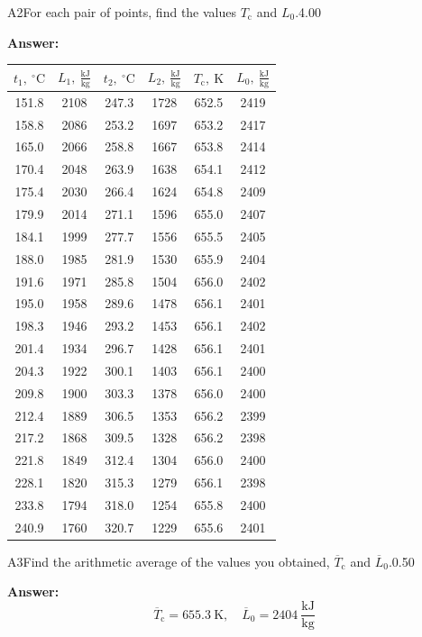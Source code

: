 \documentclass[11pt,a4paper]{article}
\begin{document}
\begin{solcard}{A2}{For each pair of points, find the values $T_\mathrm c$ and $L_0$.}{4.00}
\par\smallskip\noindent\textbf{Answer:} 

\begin{table}[H]
\centering
\begin{tabular}{|c|c|c|c|c|c|}
\hline
$t_1,~^\circ\mathrm{C}$ & $L_1,~\frac{\mathrm{kJ}}{\mathrm{kg}}$ & $t_2,~^\circ\mathrm{C}$ & $L_2,~\frac{\mathrm{kJ}}{\mathrm{kg}}$ & $T_\mathrm{c},~\mathrm{K}$ & $L_0,~\frac{\mathrm{kJ}}{\mathrm{kg}}$ \\
\hline
151.8 & 2108 & 247.3 & 1728 & 652.5 & 2419 \\
158.8 & 2086 & 253.2 & 1697 & 653.2 & 2417 \\
165.0 & 2066 & 258.8 & 1667 & 653.8 & 2414 \\
170.4 & 2048 & 263.9 & 1638 & 654.1 & 2412 \\
175.4 & 2030 & 266.4 & 1624 & 654.8 & 2409 \\
179.9 & 2014 & 271.1 & 1596 & 655.0 & 2407 \\
184.1 & 1999 & 277.7 & 1556 & 655.5 & 2405 \\
188.0 & 1985 & 281.9 & 1530 & 655.9 & 2404 \\
191.6 & 1971 & 285.8 & 1504 & 656.0 & 2402 \\
195.0 & 1958 & 289.6 & 1478 & 656.1 & 2401 \\
198.3 & 1946 & 293.2 & 1453 & 656.1 & 2402 \\
201.4 & 1934 & 296.7 & 1428 & 656.1 & 2401 \\
204.3 & 1922 & 300.1 & 1403 & 656.1 & 2400 \\
209.8 & 1900 & 303.3 & 1378 & 656.0 & 2400 \\
212.4 & 1889 & 306.5 & 1353 & 656.2 & 2399 \\
217.2 & 1868 & 309.5 & 1328 & 656.2 & 2398 \\
221.8 & 1849 & 312.4 & 1304 & 656.0 & 2400 \\
228.1 & 1820 & 315.3 & 1279 & 656.1 & 2398 \\
233.8 & 1794 & 318.0 & 1254 & 655.8 & 2400 \\
240.9 & 1760 & 320.7 & 1229 & 655.6 & 2401 \\
\hline
\end{tabular}
\end{table}
\end{solcard}

\begin{solcard}{A3}{Find the arithmetic average of the values you obtained, $\overline T_\mathrm c$ and $\overline L_0$.}{0.50}
\par\smallskip\noindent\textbf{Answer:} \[\overline T_\mathrm c=655.3~\mathrm{K},\quad\overline L_0=2404~\frac{\mathrm{kJ}}{\mathrm{kg}}\]
\end{solcard}
\end{document}
